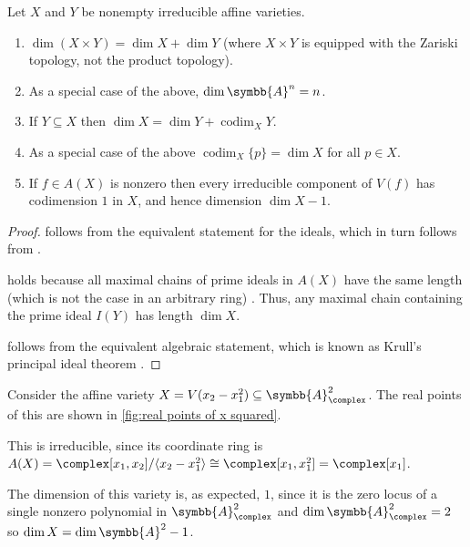 \documentclass[fleqn]{NotesClass}
\newcommand{\affine}{\symbb{A}}
\newcommand{\isomorphic}{\cong}
\DeclareMathOperator{\codim}{codim}
\begin{document}
    \begin{prp}{}{}
        Let \(X\) and \(Y\) be nonempty irreducible affine varieties.
        \begin{enumerate}
            \item \label{itm:dim product is sum dims}\(\dim (X \times Y) = \dim X + \dim Y\) (where \(X \times Y\) is equipped with the Zariski topology, not the product topology).
            \item As a special case of the above, \(\dim \affine^n = n\).
            \item \label{itm:dim is dim plus codim}If \(Y \subseteq X\) then \(\dim X = \dim Y + \codim_X Y\).
            \item As a special case of the above \(\codim_X \{p\} = \dim X\) for all \(p \in X\).
            \item \label{itm:irreducible components of V(f) have codim 1}If \(f \in A(X)\) is nonzero then every irreducible component of \(V(f)\) has codimension \(1\) in \(X\), and hence dimension \(\dim X - 1\).
        \end{enumerate}
        \begin{proof}
             follows from the equivalent statement for the ideals, which in turn follows from \cite[Ex 11.33]{gathmann.comm.alg}.
            
             holds because all maximal chains of prime ideals in \(A(X)\) have the same length (which is not the case in an arbitrary ring) \cite[Crl 11.12]{gathmann.comm.alg}.
            Thus, any maximal chain containing the prime ideal \(I(Y)\) has length \(\dim X\).
            
             follows from the equivalent algebraic statement, which is known as Krull's principal ideal theorem \cite[Prop 11.15]{gathmann.comm.alg}.
        \end{proof}
    \end{prp}
    
    \begin{exm}{}{}
        Consider the affine variety \(X = V(x_2 - x_1^2) \subseteq \affine_{\complex}^2\).
        The real points of this are shown in \cref{fig:real points of x squared}.
        
        This is irreducible, since its coordinate ring is \(A(X) = \complex[x_1, x_2] / \langle x_2 - x_1^2 \rangle \isomorphic \complex[x_1, x_1^2] = \complex[x_1]\).
        
        The dimension of this variety is, as expected, \(1\), since it is the zero locus of a single nonzero polynomial in \(\affine_{\complex}^2\) and \(\dim \affine_{\complex}^2 = 2\) so \(\dim X = \dim \affine^2 - 1\).
    \end{exm}
    
\end{document}
